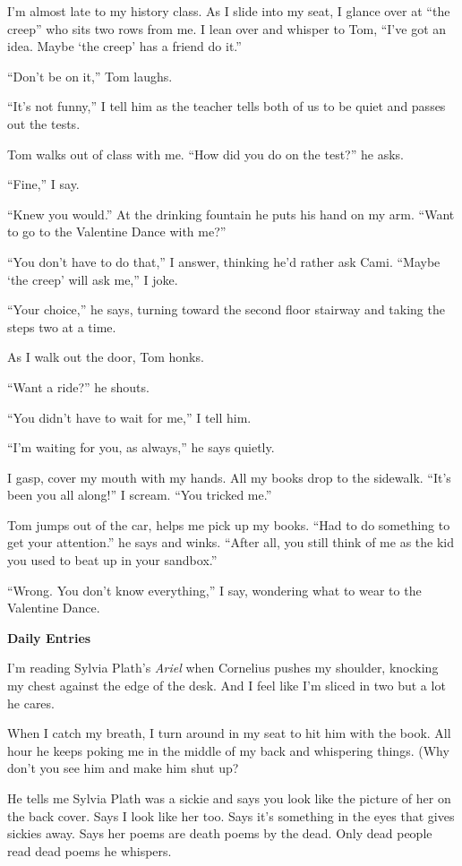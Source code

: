 \documentclass[
]{article}
\begin{document}
I'm almost late to my history class. As I slide into my seat, I glance
over at ``the creep'' who sits two rows from me. I lean over and whisper
to Tom, ``I've got an idea. Maybe `the creep' has a friend do it.''

``Don't be on it,'' Tom laughs.

``It's not funny,'' I tell him as the teacher tells both of us to be
quiet and passes out the tests.

Tom walks out of class with me. ``How did you do on the test?'' he asks.

``Fine,'' I say.

``Knew you would.'' At the drinking fountain he puts his hand on my arm.
``Want to go to the Valentine Dance with me?''

``You don't have to do that,'' I answer, thinking he'd rather ask Cami.
``Maybe `the creep' will ask me,'' I joke.

``Your choice,'' he says, turning toward the second floor stairway and
taking the steps two at a time.

As I walk out the door, Tom honks.

``Want a ride?'' he shouts.

``You didn't have to wait for me,'' I tell him.

``I'm waiting for you, as always,'' he says quietly.

I gasp, cover my mouth with my hands. All my books drop to the sidewalk.
``It's been you all along!'' I scream. ``You tricked me.''

Tom jumps out of the car, helps me pick up my books. ``Had to do
something to get your attention.'' he says and winks. ``After all, you
still think of me as the kid you used to beat up in your sandbox.''

``Wrong. You don't know everything,'' I say, wondering what to wear to
the Valentine Dance.

\textbf{\hfill\break
}

\textbf{Daily Entries}

I'm reading Sylvia Plath's \emph{Ariel} when Cornelius pushes my
shoulder, knocking my chest against the edge of the desk. And I feel
like I'm sliced in two but a lot he cares.

When I catch my breath, I turn around in my seat to hit him with the
book. All hour he keeps poking me in the middle of my back and
whispering things. (Why don't you see him and make him shut up?

He tells me Sylvia Plath was a sickie and says you look like the picture
of her on the back cover. Says I look like her too. Says it's something
in the eyes that gives sickies away. Says her poems are death poems by
the dead. Only dead people read dead poems he whispers.
\end{document}
